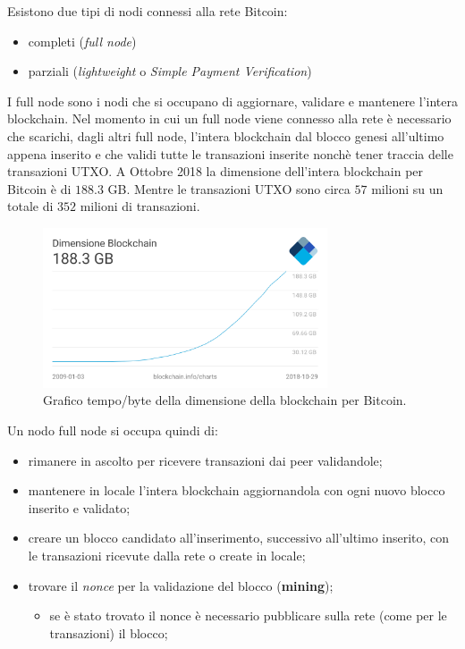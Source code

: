\begin{enumerate}[1.]
Esistono due tipi di nodi connessi alla rete Bitcoin:
\begin{itemize}
    \item completi (\textit{full node})
    \item parziali (\textit{lightweight} o \textit{Simple Payment Verification})
\end{itemize}
I full node sono i nodi che si occupano di aggiornare, validare e mantenere l'intera blockchain. Nel momento in cui un full node viene connesso alla rete è necessario che scarichi, dagli altri full node, l'intera blockchain dal blocco genesi all'ultimo appena inserito e che validi tutte le transazioni inserite nonchè tener traccia delle transazioni UTXO.\newline
A Ottobre 2018 la dimensione dell'intera blockchain per Bitcoin è di $188.3$ GB. Mentre le transazioni UTXO sono circa $57$ milioni su un totale di $352$ milioni di transazioni.
\begin{figure}[H]
    \centering
    \includegraphics[width=0.75\textwidth]{images/bcsize.png}
    \caption{Grafico tempo/byte della dimensione della blockchain per Bitcoin.}
\end{figure}
Un nodo full node si occupa quindi di:
\begin{itemize}
    \item rimanere in ascolto per ricevere transazioni dai peer validandole;
    \item mantenere in locale l'intera blockchain aggiornandola con ogni nuovo blocco inserito e validato;
    \item creare un blocco candidato all'inserimento, successivo all'ultimo inserito, con le transazioni ricevute dalla rete o create in locale;
    \item trovare il \textit{nonce} per la validazione del blocco (\textbf{mining});
    \begin{itemize}
        \item se è stato trovato il nonce è necessario pubblicare sulla rete (come per le transazioni) il blocco;

\end{itemize}
\end{itemize}
\end{enumerate}

